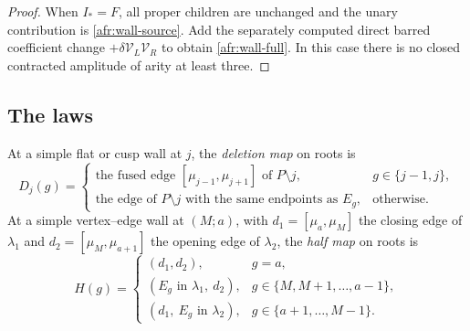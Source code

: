 \begin{proof}
When $I_*=F$, all proper children are unchanged and the unary
contribution is \eqref{afr:wall-source}.  Add the separately computed
direct barred coefficient change $+\delta \mathcal V_L\mathcal V_R$ to obtain
\eqref{afr:wall-full}.  In this case there is no closed contracted
amplitude of arity at least three.
\end{proof}




\subsection{The laws}

\begin{definition}\label{def:induced-roots}
At a simple flat or cusp wall at $j$, the \emph{deletion map} on roots is
\[
D_j(g)=\begin{cases}\text{the fused edge }[\mu_{j-1},\mu_{j+1}]\text{ of }P\setminus j,& g\in\{j-1,j\},\\
\text{the edge of }P\setminus j\text{ with the same endpoints as }E_g,&\text{otherwise.}\end{cases}
\]
At a simple vertex--edge wall at $(M;a)$, with $d_1=[\mu_a,\mu_M]$ the
closing edge of $\lambda_1$ and $d_2=[\mu_M,\mu_{a+1}]$ the opening edge of
$\lambda_2$, the \emph{half map} on roots is
\[
H(g)=\begin{cases}(d_1,d_2),&g=a,\\
(E_g\text{ in }\lambda_1,\ d_2),&g\in\{M,M+1,\ldots,a-1\},\\
(d_1,\ E_g\text{ in }\lambda_2),&g\in\{a+1,\ldots,M-1\}.\end{cases}
\]
\end{definition}

